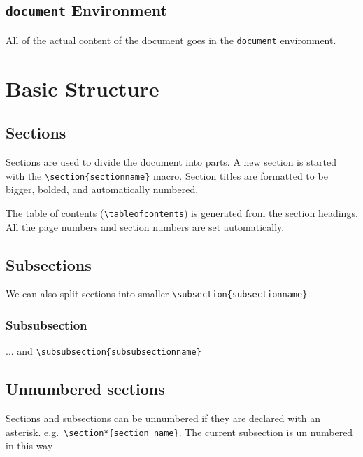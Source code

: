 \documentclass{article}
\begin{document}
\subsection{\lstinline{document} Environment}
All of the actual content of the document goes in the \lstinline{document} environment.

\section{Basic Structure}

\subsection{Sections}
Sections are used to divide the document into parts. A new section is started with the \lstinline|\section{sectionname}| macro. Section titles are formatted to be bigger, bolded, and automatically numbered.

The table of contents (\lstinline{\tableofcontents}) is generated from the section headings. All the page numbers and section numbers are set automatically.

\subsection{Subsections}
We can also split sections into smaller \lstinline|\subsection{subsectionname}|
\subsubsection{Subsubsection}
... and \lstinline|\subsubsection{subsubsectionname}|

\subsection*{Unnumbered sections}
Sections and subsections can be unnumbered if they are declared with an asterisk. e.g.\ \lstinline|\section*{section name}|. The current subsection is un numbered in this way
\end{document}
